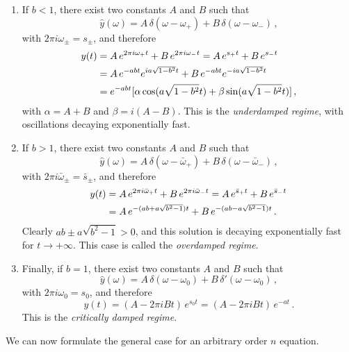 \begin{enumerate}
  \item If $b<1$, there exist two constants $A$ and $B$ such that
        \begin{equation}
          \hat{y}(\omega)=A\,\delta(\omega-\omega_+)+B\,\delta(\omega-\omega_-)\,,
        \end{equation}
        with $2\pi i\omega_{\pm}=s_\pm$, and therefore
        \begin{align}
          y(t) & =A\,e^{2\pi i\omega_+ t}+B\,e^{2\pi i\omega_- t}
          =A\,e^{s_+ t}+B\,e^{s_- t}
          \notag                                                                       \\
               & =A\,e^{-abt}e^{ia\sqrt{1-b^2}t}+B\,e^{-abt}e^{-ia\sqrt{1-b^2}t}\notag \\
               & =e^{-abt}[\alpha\cos(a\sqrt{1-b^2}t)+\beta\sin(a\sqrt{1-b^2}t)]\,,
          \label{eq:ode2-damped-under}
        \end{align}
        with $\alpha=A+B$ and $\beta=i(A-B)$. This is the \emph{underdamped regime}, with
        oscillations decaying exponentially fast.
  \item If $b>1$, there exist two constants $A$ and $B$ such that
        \begin{equation}
          \hat{y}(\omega)=A\,\delta(\omega-\bar{\omega}_+)+B\,\delta(\omega-\bar{\omega}_-)\,,
        \end{equation}
        with $2\pi i\bar{\omega}_{\pm}=\bar{s}_\pm$, and therefore
        \begin{align}
          y(t) & =A\,e^{2\pi i\bar{\omega}_+ t}+B\,e^{2\pi i\bar{\omega}_- t}
          =A\,e^{\bar{s}_+ t}+B\,e^{\bar{s}_- t}\notag                        \\
               & =A\,e^{-(ab+a\sqrt{b^2-1})t}+B\,e^{-(ab-a\sqrt{b^2-1})t}\,.
          \label{eq:ode2-damped-over}
        \end{align}
        Clearly $ab\pm a\sqrt{b^2-1}>0$, and this solution is decaying exponentially fast for
        $t\to+\infty$. This case is called the \emph{overdamped regime}.
  \item Finally, if $b=1$, there exist two constants $A$ and $B$ such that
        \begin{equation}
          \hat{y}(\omega)=A\,\delta(\omega-\omega_0)+B\,\delta'(\omega-\omega_0)\,,
        \end{equation}
        with $2\pi i\omega_{0}=s_0$, and therefore
        \begin{equation}
          y(t)=(A-2\pi i Bt)\,e^{s_0 t}
          =(A-2\pi i Bt)\,e^{-at}\,.
          \label{eq:ode2-damped-crit}
        \end{equation}
        This is the \emph{critically damped regime}.
\end{enumerate}
We can now formulate the general case for an arbitrary order $n$ equation.
